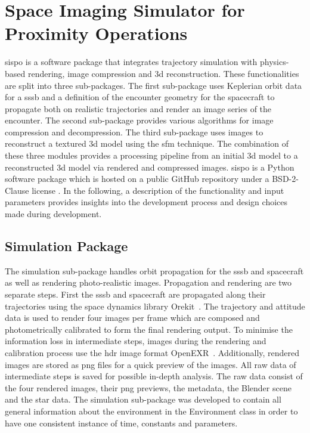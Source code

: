 \section{Space Imaging Simulator for Proximity Operations} \label{sec:sispo}
\gls{sispo} is a software package that integrates trajectory simulation with physics-based rendering, image compression and \gls{3d} reconstruction. These functionalities are split into three sub-packages. The first sub-package uses Keplerian orbit data for a \gls{sssb} and a definition of the encounter geometry for the spacecraft to propagate both on realistic trajectories and render an image series of the encounter. The second sub-package provides various algorithms for image compression and decompression. The third sub-package uses images to reconstruct a textured \gls{3d} model using the \gls{sfm} technique. The combination of these three modules provides a processing pipeline from an initial \gls{3d} model to a reconstructed \gls{3d} model via rendered and compressed images. \Gls{sispo} is a Python software package which is hosted on a public GitHub repository under a BSD-2-Clause license \cite{Schwarzkopf2020SpaceOperations}. In the following, a description of the functionality and input parameters provides insights into the development process and design choices made during development.

\subsection{Simulation Package}
The simulation sub-package handles orbit propagation for the \gls{sssb} and spacecraft as well as rendering photo-realistic images. Propagation and rendering are two separate steps. First the \gls{sssb} and spacecraft are propagated along their trajectories using the space dynamics library Orekit~\cite{orekit}. The  trajectory and attitude data is used to render four images per frame which are composed and photometrically calibrated to form the final rendering output. To minimise the information loss in intermediate steps, images during the rendering and calibration process use the \gls{hdr} image format OpenEXR~\cite{openexr}. Additionally, rendered images are stored as \gls{png} files for a quick preview of the images. All raw data of intermediate steps is saved for possible in-depth analysis. The raw data consist of the four rendered images, their \gls{png} previews, the metadata, the Blender scene and the star data. The simulation sub-package was developed to contain all general information about the environment in the Environment class in order to have one consistent instance of time, constants and parameters.

